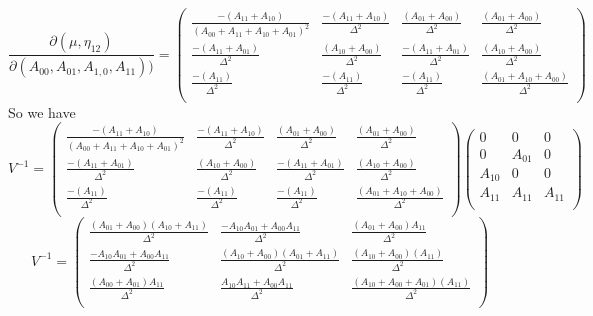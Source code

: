 \documentclass{homework}
\begin{document}
\begin{itemize}
 \[
       \frac{\partial (\mu,\eta_{12})}{\partial (A_{00},A_{01},A_{1,0},A_{11})) } = 
       \begin{pmatrix}
  \frac{-(A_{11} + A_{10})}{(A_{00}+ A_{11} + A_{10}+ A_{01})^2} & \frac{-(A_{11} + A_{10})}{\Delta^2} & \frac{(A_{01} + A_{00})}{\Delta^2} & \frac{(A_{01} + A_{00})}{\Delta^2} \\ 
  \frac{-(A_{11} + A_{01})}{\Delta^2} & \frac{(A_{10} + A_{00})}{\Delta^2} &  \frac{-(A_{11} + A_{01})}{\Delta^2} & \frac{(A_{10} + A_{00})}{\Delta^2} \\
  \frac{-(A_{11})}{\Delta^2} & \frac{-(A_{11})}{\Delta^2}&  \frac{-(A_{11})}{\Delta^2} & \frac{(A_{01} +A_{10} + A_{00})}{\Delta^2} \\
\end{pmatrix}
    \]
    So we have
    \[
       V^{-1} =  \begin{pmatrix}
  \frac{-(A_{11} + A_{10})}{(A_{00}+ A_{11} + A_{10}+ A_{01})^2} & \frac{-(A_{11} + A_{10})}{\Delta^2} & \frac{(A_{01} + A_{00})}{\Delta^2} & \frac{(A_{01} + A_{00})}{\Delta^2} \\ 
  \frac{-(A_{11} + A_{01})}{\Delta^2} & \frac{(A_{10} + A_{00})}{\Delta^2} &  \frac{-(A_{11} + A_{01})}{\Delta^2} & \frac{(A_{10} + A_{00})}{\Delta^2} \\
  \frac{-(A_{11})}{\Delta^2} & \frac{-(A_{11})}{\Delta^2}&  \frac{-(A_{11})}{\Delta^2} & \frac{(A_{01} +A_{10} + A_{00})}{\Delta^2} \\
\end{pmatrix} \begin{pmatrix}
  0 & 0 & 0 \\ 
  0 & A_{01} & 0 \\
  A_{10} & 0 & 0 \\
  A_{11} & A_{11} & A_{11}\\
\end{pmatrix}
    \]
    \[
       V^{-1} = \begin{pmatrix}
  \frac{(A_{01}+A_{00})(A_{10}+A_{11})}{\Delta^2} & \frac{-A_{10}A_{01} + A_{00}A_{11}}{\Delta^2} & \frac{(A_{01}+A_{00})A_{11}}{\Delta^2} \\ 
  \frac{-A_{10}A_{01} + A_{00}A_{11}}{\Delta^2} & \frac{(A_{10}+A_{00})(A_{01}+A_{11})}{\Delta^2} & \frac{(A_{10}+A_{00})(A_{11})}{\Delta^2} \\
  \frac{ (A_{00}+ A_{01})A_{11}}{\Delta^2} & \frac{A_{10}A_{11} + A_{00}A_{11}}{\Delta^2} & \frac{(A_{10}+A_{00}+A_{01})(A_{11})}{\Delta^2}  \\
\end{pmatrix} 
    \]
    \[
\]
\end{itemize}
\end{document}

